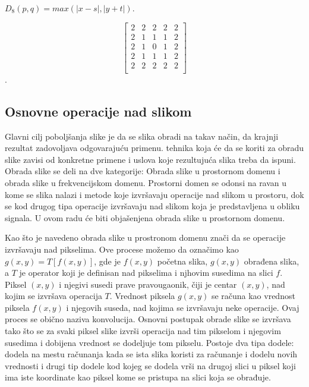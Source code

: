 \documentclass[a4paper,12pt,titlepage]{article}
\begin{document}
\begin{center}
$D_{8}(p, q) = max(|x - s|, |y + t|).$
\end{center} 

\[
\begin{bmatrix}
     2 & 2 & 2 & 2  & 2 \\
     2 & 1 & 1 & 1  & 2 \\
     2 & 1 & 0 & 1 & 2 \\
     2 & 1 & 1 & 1  & 2 \\
     2 & 2 & 2 & 2  & 2 \\
\end{bmatrix}
\].\\

\subsection{Osnovne operacije nad slikom}%

Glavni cilj poboljšanja slike je da se slika obradi na takav način, da krajnji rezultat zadovoljava odgovarajuću primenu. tehnika koja će da se koriti za obradu slike zavisi od konkretne primene i uslova koje rezultujuća slika treba da ispuni. Obrada slike se deli na dve kategorije: Obrada slike u prostornom domenu i obrada slike u frekvencijskom domenu. Prostorni domen se odonsi na ravan u kome se slika nalazi i metode koje izvršavaju operacije nad slikom u prostoru, dok se kod drugog tipa operacije izvršavaju nad slikom koja je predstavljena u obliku signala. U ovom radu će biti objašenjena obrada slike u prostornom domenu.

Kao što je navedeno obrada slike u prostronom domenu znači da se operacije izvršavaju nad pikselima. Ove procese možemo da označimo kao $g(x, y) = T[f(x, y)]$, gde je $f(x, y)$ početna slika, $g(x, y)$ obrađena slika, a $T$ je operator koji je definisan nad pikselima i njhovim susedima na slici $f$. Piksel $(x, y)$ i njegivi susedi prave pravougaonik, čiji je centar $(x, y)$, nad kojim se izvršava operacija $T$. Vrednost piksela $g(x, y)$ se računa kao vrednost piksela $f(x, y)$ i njegovih suseda, nad kojima se izvršavaju neke operacije. Ovaj proces se obično naziva konvolucija. Osnovni postupak obrade slike se izvršava tako što se za svaki piksel slike izvrši operacija nad tim pikselom i njegovim susedima i dobijena vrednost se dodeljuje tom pikselu. Postoje dva tipa dodele: dodela na mestu računanja kada se ista slika koristi za računanje i dodelu novih vrednosti i drugi tip dodele kod kojeg se dodela vrši na drugoj slici u piksel koji ima iste koordinate kao piksel kome se pristupa na slici koja se obrađuje.   
\end{document}
